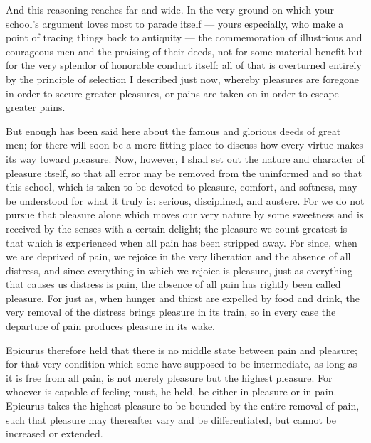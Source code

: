  And this reasoning reaches far and wide. In the very ground on which your school's argument loves most to parade itself — yours especially, who make a point of tracing things back to antiquity — the commemoration of illustrious and courageous men and the praising of their deeds, not for some material benefit but for the very splendor of honorable conduct itself: all of that is overturned entirely by the principle of selection I described just now, whereby pleasures are foregone in order to secure greater pleasures, or pains are taken on in order to escape greater pains.



 But enough has been said here about the famous and glorious deeds of great men; for there will soon be a more fitting place to discuss how every virtue makes its way toward pleasure. Now, however, I shall set out the nature and character of pleasure itself, so that all error may be removed from the uninformed and so that this school, which is taken to be devoted to pleasure, comfort, and softness, may be understood for what it truly is: serious, disciplined, and austere. For we do not pursue that pleasure alone which moves our very nature by some sweetness and is received by the senses with a certain delight; the pleasure we count greatest is that which is experienced when all pain has been stripped away. For since, when we are deprived of pain, we rejoice in the very liberation and the absence of all distress, and since everything in which we rejoice is pleasure, just as everything that causes us distress is pain, the absence of all pain has rightly been called pleasure. For just as, when hunger and thirst are expelled by food and drink, the very removal of the distress brings pleasure in its train, so in every case the departure of pain produces pleasure in its wake.

 Epicurus therefore held that there is no middle state between pain and pleasure; for that very condition which some have supposed to be intermediate, as long as it is free from all pain, is not merely pleasure but the highest pleasure. For whoever is capable of feeling must, he held, be either in pleasure or in pain. Epicurus takes the highest pleasure to be bounded by the entire removal of pain, such that pleasure may thereafter vary and be differentiated, but cannot be increased or extended.

